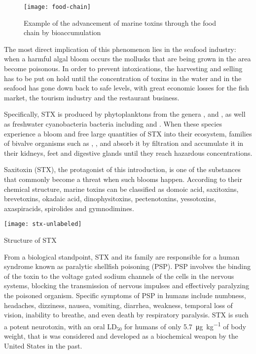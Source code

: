 \begin{figure}
    \centering
    \texttt{[image: food-chain]}
    \caption[Marine toxins through the food chain]{Example of the advancement of marine toxins through the food chain by bioaccumulation}
\end{figure}

The most direct implication of this phenomenon lies in the seafood industry: when a harmful algal bloom occurs the mollusks that are being grown in the area become poisonous.
In order to prevent intoxications, the harvesting and selling has to be put on hold until the concentration of toxins in the water and in the seafood has gone down back to safe levels, with great economic losses for the fish market, the tourism industry and the restaurant business.

Specifically, STX is produced by phytoplanktons from the genera ,  and ,\cite{gerssen10} as well as freshwater cyanobacteria bacteria including  and .\cite{smith11,tebrineh10,}
When these species experience a bloom and free large quantities of STX into their ecosystem, families of bivalve organisms such as , ,  and  absorb it by filtration and accumulate it in their kidneys, feet and digestive glands\cite{oikawa05} until they reach hazardous concentrations.

Saxitoxin (STX), the protagonist of this introduction, is one of the substances that commonly become a threat when such blooms happen.
According to their chemical structure, marine toxins can be classified as domoic acid, saxitoxins, brevetoxins, okadaic acid, dinophysitoxins, pectenotoxins, yessotoxins, axaspiracids, spirolides and gymnodimines.\cite{gerssen10}

\begin{marginfigure}
    \texttt{[image: stx-unlabeled]}
    \caption[Structure of STX]{Structure of STX}
\end{marginfigure}

From a biological standpoint, STX and its family are responsible for a human syndrome known as paralytic shellfish poisoning (PSP).
PSP involves the binding of the toxin to the voltage gated sodium channels of the cells in the nervous systems, blocking the transmission of nervous impulses and effectively paralyzing the poisoned organism.
Specific symptoms of PSP in humans include numbness, headaches, dizziness, nausea, vomiting, diarrhea, weakness, temporal loss of vision, inability to breathe, and even death by respiratory paralysis.\cite{visciano16,gerssen10}
STX is such a potent neurotoxin, with an oral LD$_{50}$ for humans of only \SI{5.7}{\micro\gram\per\kilo\gram} of body weight,\cite{nguyen20} that is was considered and developed as a biochemical weapon by the United States in the past.\cite{stewart06}

